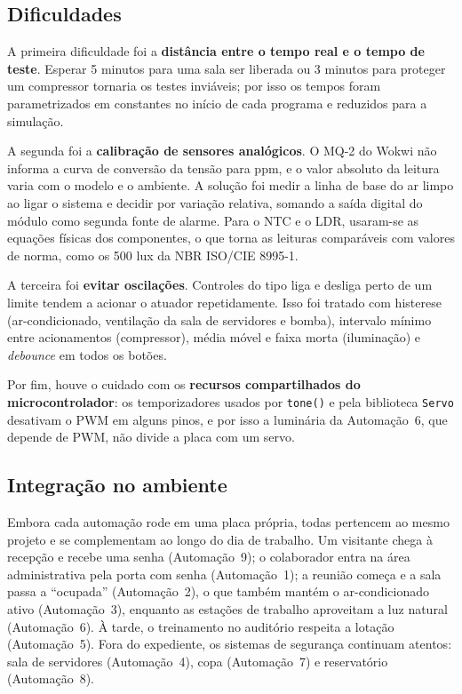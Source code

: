 \documentclass[12pt]{article}
\begin{document}
\subsection{Dificuldades}

A primeira dificuldade foi a \textbf{distância entre o tempo real e o tempo de teste}. Esperar 5 minutos para uma sala ser liberada ou 3 minutos para proteger um compressor tornaria os testes inviáveis; por isso os tempos foram parametrizados em constantes no início de cada programa e reduzidos para a simulação.

A segunda foi a \textbf{calibração de sensores analógicos}. O MQ-2 do Wokwi não informa a curva de conversão da tensão para ppm, e o valor absoluto da leitura varia com o modelo e o ambiente. A solução foi medir a linha de base do ar limpo ao ligar o sistema e decidir por variação relativa, somando a saída digital do módulo como segunda fonte de alarme. Para o NTC e o LDR, usaram-se as equações físicas dos componentes, o que torna as leituras comparáveis com valores de norma, como os 500 lux da NBR ISO/CIE 8995-1.

A terceira foi \textbf{evitar oscilações}. Controles do tipo liga e desliga perto de um limite tendem a acionar o atuador repetidamente. Isso foi tratado com histerese (ar-condicionado, ventilação da sala de servidores e bomba), intervalo mínimo entre acionamentos (compressor), média móvel e faixa morta (iluminação) e \emph{debounce} em todos os botões.

Por fim, houve o cuidado com os \textbf{recursos compartilhados do microcontrolador}: os temporizadores usados por \texttt{tone()} e pela biblioteca \texttt{Servo} desativam o PWM em alguns pinos, e por isso a luminária da Automação~6, que depende de PWM, não divide a placa com um servo.

\subsection{Integração no ambiente}

Embora cada automação rode em uma placa própria, todas pertencem ao mesmo projeto e se complementam ao longo do dia de trabalho. Um visitante chega à recepção e recebe uma senha (Automação~9); o colaborador entra na área administrativa pela porta com senha (Automação~1); a reunião começa e a sala passa a ``ocupada'' (Automação~2), o que também mantém o ar-condicionado ativo (Automação~3), enquanto as estações de trabalho aproveitam a luz natural (Automação~6). À tarde, o treinamento no auditório respeita a lotação (Automação~5). Fora do expediente, os sistemas de segurança continuam atentos: sala de servidores (Automação~4), copa (Automação~7) e reservatório (Automação~8).
\end{document}
